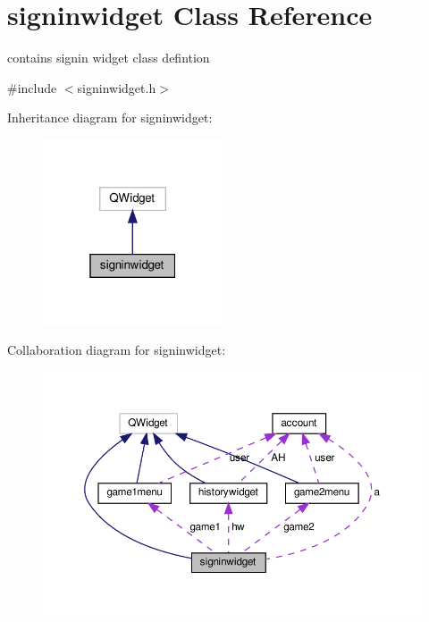 \hypertarget{classsigninwidget}{}\section{signinwidget Class Reference}
\label{classsigninwidget}


contains signin widget class defintion  




{\ttfamily \#include $<$signinwidget.\+h$>$}



Inheritance diagram for signinwidget\+:\nopagebreak
\begin{figure}[H]
\begin{center}
\leavevmode
\includegraphics[width=151pt]{classsigninwidget__inherit__graph}
\end{center}
\end{figure}


Collaboration diagram for signinwidget\+:
\nopagebreak
\begin{figure}[H]
\begin{center}
\leavevmode
\includegraphics[width=350pt]{classsigninwidget__coll__graph}
\end{center}
\end{figure}
